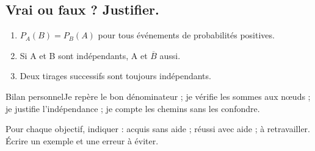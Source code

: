 \subsection*{Vrai ou faux ? Justifier.}\label{C05-VF}
\begin{enumerate}
\item $P_A(B)=P_B(A)$ pour tous événements de probabilités positives.
\item Si A et B sont indépendants, A et $\overline B$ aussi.
\item Deux tirages successifs sont toujours indépendants.
\end{enumerate}
\begin{repere}{Bilan personnel}Je repère le bon dénominateur ; je vérifie les sommes aux nœuds ; je justifie l’indépendance ; je compte les chemins sans les confondre.

Pour chaque objectif, indiquer : acquis sans aide ; réussi avec aide ; à retravailler. Écrire un exemple et une erreur à éviter.\end{repere}
\endgroup
\ifprof\fi
